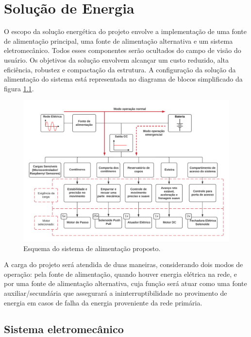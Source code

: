 \chapter[Solução de Energia]{Solução de Energia}
\label{Solução_energia}


O escopo da solução energética do projeto envolve a implementação de uma fonte de alimentação principal, uma fonte de alimentação alternativa e um sistema eletromecânico. Todos esses componentes serão ocultados do campo de visão do usuário. Os objetivos da solução envolvem alcançar um custo reduzido, alta eficiência, robustez e compactação da estrutura. A configuração da solução da alimentação do sistema está representada no diagrama de blocos simplificado da figura \ref{fig:energia_alimentacao}.

\begin{figure}[H]
    \centering
    \includegraphics[width=1\textwidth]{figuras/Alimentação.png}
    \caption{Esquema do sistema de alimentação proposto.}
    \label{fig:energia_alimentacao}
\end{figure}

A carga do projeto será atendida de duas maneiras, considerando dois modos de operação: pela fonte de alimentação, quando houver energia elétrica na rede, e por uma fonte de alimentação alternativa, cuja função será atuar como uma fonte auxiliar/secundária que assegurará a ininterruptibilidade no provimento de energia em casos de falha da energia proveniente da rede primária.

\section{Sistema eletromecânico}

